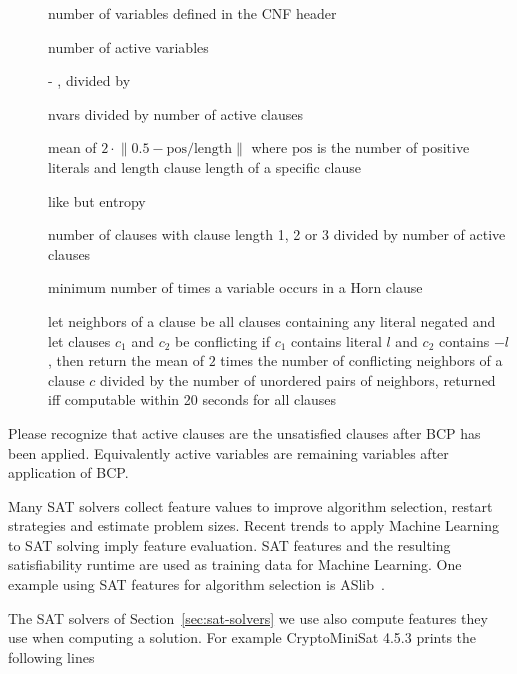 \begin{description}
\item[] number of variables defined in the CNF header
\item[] number of active variables
\item[]  - , divided by 
\item[] nvars divided by number of active clauses
\item[] mean of $2 \cdot \left\| 0.5 - {\text{pos}}/{\text{length}}\right\|$ where $\text{pos}$ is the number of positive literals and $\text{length}$ clause length of a specific clause
\item[] like  but entropy
\item[] number of clauses with clause length 1, 2 or 3 divided by number of active clauses
\item[] minimum number of times a variable occurs in a Horn clause
\item[]
   let neighbors of a clause be all clauses containing any literal negated
   and let clauses $c_1$ and $c_2$ be conflicting if $c_1$ contains literal $l$ and $c_2$ contains $-l$,
   then return the mean of $2$ times the number of conflicting neighbors of a clause $c$
   divided by the number of unordered pairs of neighbors,
   returned iff computable within 20 seconds for all clauses
\end{description}

Please recognize that active clauses are the unsatisfied clauses after BCP has been applied.
Equivalently active variables are remaining variables after application of BCP.

Many SAT solvers collect feature values to improve algorithm selection,
restart strategies and estimate problem sizes. Recent trends to apply Machine
Learning to SAT solving imply feature evaluation. SAT features and the resulting
satisfiability runtime are used as training data for Machine Learning. One example
using SAT features for algorithm selection is ASlib~\cite{aslib}.

The SAT solvers of Section~\ref{sec:sat-solvers} we use also compute features they use
when computing a solution. For example CryptoMiniSat 4.5.3 prints the following lines

